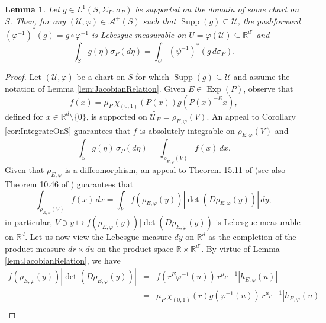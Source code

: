 \documentclass[11pt]{article}
\newtheorem{lemma}[theorem]{Lemma}
\theoremstyle{remark}
\newcommand\Exp{\operatorname{Exp}}
\newcommand\supp{\operatorname{Supp}}
\renewcommand\det{\operatorname{det}}
\begin{document}
\begin{lemma}\label{lem:LocalIntegralFormula}
Let $g\in L^1(S,\Sigma_P,\sigma_P)$ be supported on the domain of some chart on $S$. Then, for any $(\mathcal{U},\varphi)\in\mathcal{A}^+(S)$ such that $\supp(g)\subseteq\mathcal{U}$, the pushforward $(\varphi^{-1})^*(g)=g\circ\varphi^{-1}$ is Lebesgue measurable on $U=\varphi(\mathcal{U})\subseteq\mathbb{R}^{d'}$ and 
\begin{equation*}
\int_S g(\eta)\sigma_P(d\eta)=\int_{U}(\psi^{-1})^*(g\, d\sigma_P).
\end{equation*}
\end{lemma}
\begin{proof}
Let $(\mathcal{U},\varphi)$ be a chart on $S$ for which $\supp(g)\subseteq \mathcal{U}$ and assume the notation of Lemma \ref{lem:JacobianRelation}. Given $E\in\Exp(P)$, observe that
\begin{equation*}
    f(x)=\mu_P\, \chi_{(0,1)}(P(x))g(P(x)^{-E}x),
\end{equation*}
defined for $x\in\mathbb{R}^d\setminus\{0\}$, is supported on $\widetilde{\mathcal{U}_E}=\rho_{E,\varphi}(V)$. An appeal to Corollary \ref{cor:IntegrateOnS} guarantees that $f$ is absolutely integrable on $\rho_{E,\varphi}(V)$ and
\begin{equation}\label{eq:LocalIntegralFormula1}
\int_S g(\eta)\,\sigma_P(d\eta)=\int_{\rho_{E,\varphi}(V)}f(x)\,dx.
\end{equation}
Given that $\rho_{E,\varphi}$ is a diffeomorphism, an appeal to Theorem 15.11 of \cite{Apostol1974} (see also Theorem 10.46 of \cite{Browder1996}) guarantees that
\begin{equation}\label{eq:LocalIntegralFormula2}
\int_{\rho_{E,\varphi}(V)}f(x)\,dx=\int_V f(\rho_{E,\varphi}(y))|\det(D\rho_{E,\varphi}(y))|\,dy;
\end{equation}
in particular, $V\ni y\mapsto f(\rho_{E,\varphi}(y))|\det(D\rho_{E,\varphi}(y))$ is Lebesgue measurable on $\mathbb{R}^{d}$. Let us now view the Lebesgue measure $dy$ on $\mathbb{R}^d$ as the completion of the product measure $dr\times du$ on the product space $\mathbb{R}\times\mathbb{R}^{d'}$. By virtue of Lemma \ref{lem:JacobianRelation}, we have
\begin{eqnarray}\label{eq:LocalIntegralFormula3}\nonumber
    f(\rho_{E,\varphi}(y))|\det(D\rho_{E,\varphi}(y))|
    &=& f(r^E\varphi^{-1}(u))\,r^{\mu_{P}-1}|h_{E,\varphi}(u)|\\ \nonumber
    &=& \mu_P\,\chi_{(0,1)}(r)g(\varphi^{-1}(u))\, r^{\mu_P-1}|h_{E,\varphi}(u)|\\ 

\end{eqnarray}
\end{proof}
\end{document}
